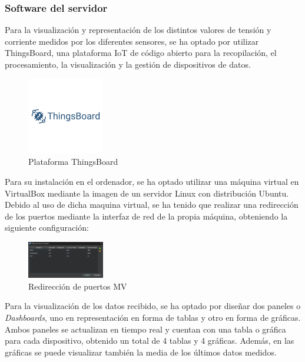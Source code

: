 \subsubsection{Software del servidor}
Para la visualización y representación de los distintos valores de tensión y corriente medidos por los diferentes sensores, se ha optado por utilizar ThingsBoard, una plataforma IoT de código abierto para la recopilación, el procesamiento, la visualización y la gestión de dispositivos de datos.

\begin{figure}[H]
    \centering
    \includegraphics[width=0.3\textwidth]{images/3-software/3-2-2-thingsboard/LogoThingsboard.png}
    \caption{Plataforma ThingsBoard}
    \label{fig:3-2-2-ThingsBoard}
\end{figure}

Para su instalación en el ordenador, se ha optado utilizar una máquina virtual en VirtualBox mediante la imagen de un servidor Linux con distribución Ubuntu.
Debido al uso de dicha maquina virtual, se ha tenido que realizar una redirección de los puertos mediante la interfaz de red de la propia máquina, obteniendo la siguiente configuración:

\begin{figure}[H]
    \centering
    \includegraphics[width=0.3\textwidth]{images/3-software/3-2-2-thingsboard/PuertosMV.png}
    \caption{Redirección de puertos MV}
    \label{fig:3-2-2-PuertosMV}
\end{figure}

Para la visualización de los datos recibido, se ha optado por diseñar dos paneles o \textit{Dashboards}, uno en representación en forma de tablas y otro en forma de gráficas. Ambos paneles se actualizan en tiempo real y cuentan con una tabla o gráfica para cada dispositivo, obtenido un total de 4 tablas y 4 gráficas. Además, en las gráficas se puede visualizar también la media de los últimos datos medidos.

